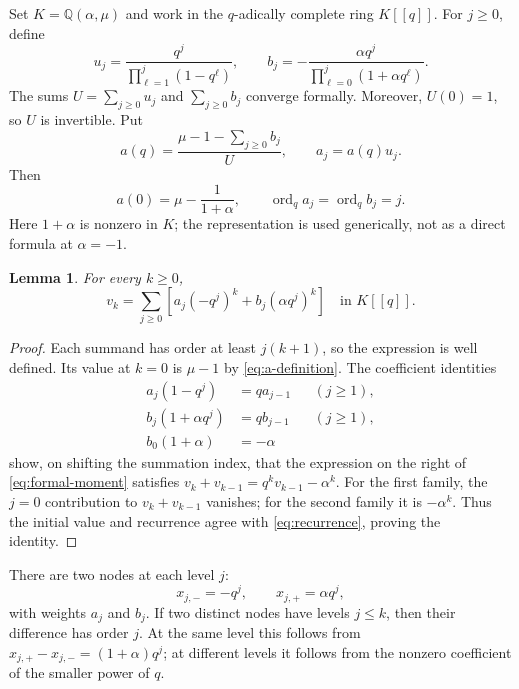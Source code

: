 \documentclass[11pt]{article}
\numberwithin{equation}{section}
\newtheorem{lemma}[lemma]{Lemma}
\theoremstyle{definition}
\theoremstyle{remark}
\newcommand{\Q}{\mathbb{Q}}
\newcommand{\ordq}{\operatorname{ord}_q}
\begin{document}
Set $K=\Q(\alpha,\mu)$ and work in the $q$-adically complete ring $K[[q]]$.
For $j\ge0$, define
\begin{equation}\label{eq:formal-weights}
 u_j=\frac{q^j}{\prod_{\ell=1}^{j}(1-q^\ell)},\qquad
 b_j=-\frac{\alpha q^j}{\prod_{\ell=0}^{j}(1+\alpha q^\ell)}.
\end{equation}
The sums $U=\sum_{j\ge0}u_j$ and $\sum_{j\ge0}b_j$ converge formally.
Moreover, $U(0)=1$, so $U$ is invertible. Put
\begin{equation}\label{eq:a-definition}
 a(q)=\frac{\mu-1-\sum_{j\ge0}b_j}{U},\qquad a_j=a(q)u_j.
\end{equation}
Then
\begin{equation}\label{eq:a0}
 a(0)=\mu-\frac1{1+\alpha},\qquad
 \ordq a_j=\ordq b_j=j.
\end{equation}
Here $1+\alpha$ is nonzero in $K$; the representation is used generically,
not as a direct formula at $\alpha=-1$.

\begin{lemma}\label{lem:formal-moment}
For every $k\ge0$,
\begin{equation}\label{eq:formal-moment}
 v_k=\sum_{j\ge0}\left[a_j(-q^j)^k+b_j(\alpha q^j)^k\right]
 \quad\text{in }K[[q]].
\end{equation}
\end{lemma}
\begin{proof}
Each summand has order at least $j(k+1)$, so the expression is well defined.
Its value at $k=0$ is $\mu-1$ by \eqref{eq:a-definition}.
The coefficient identities
\begin{align*}
 a_j(1-q^j)&=qa_{j-1} &&(j\ge1),\\
 b_j(1+\alpha q^j)&=qb_{j-1} &&(j\ge1),\\
 b_0(1+\alpha)&=-\alpha
\end{align*}
show, on shifting the summation index, that the expression on the right of
\eqref{eq:formal-moment} satisfies
$v_k+v_{k-1}=q^kv_{k-1}-\alpha^k$. For the first family, the $j=0$
contribution to $v_k+v_{k-1}$ vanishes; for the second family it is
$-\alpha^k$. Thus the initial value and recurrence agree with
\eqref{eq:recurrence}, proving the identity.
\end{proof}

There are two nodes at each level $j$:
\begin{equation}\label{eq:formal-nodes}
 x_{j,-}=-q^j,\qquad x_{j,+}=\alpha q^j,
\end{equation}
with weights $a_j$ and $b_j$. If two distinct nodes have levels $j\le k$,
then their difference has order $j$. At the same level this follows from
$x_{j,+}-x_{j,-}=(1+\alpha)q^j$; at different levels it follows from the
nonzero coefficient of the smaller power of $q$.
\end{document}
